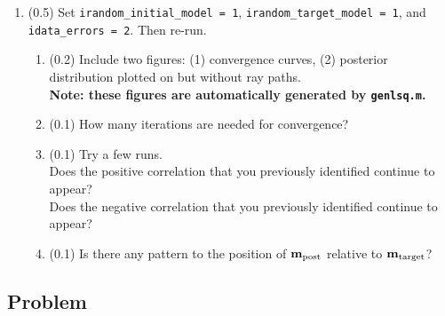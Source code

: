 \documentclass[11pt,titlepage,fleqn]{article}
\begin{document}
\begin{enumerate}

\item (0.5) Set \verb+irandom_initial_model = 1+, \verb+irandom_target_model = 1+, and \verb+idata_errors = 2+. Then re-run.
%
\begin{enumerate}
\item (0.2) Include two figures: (1) convergence curves, (2) posterior distribution plotted on  but without ray paths. \\
{\bf Note: these figures are automatically generated by \verb+genlsq.m+.}
\item (0.1) How many iterations are needed for convergence?
\item (0.1) Try a few runs. \\
Does the positive correlation that you previously identified continue to appear? \\
Does the negative correlation that you previously identified continue to appear?
\item (0.1) Is there any pattern to the position of $\mbox{${\bf m}$}_{\rm post}$ relative to $\mbox{${\bf m}$}_{\rm target}$?
\end{enumerate}

\end{enumerate}


\pagebreak

\subsection*{Problem} \howmuchtime\




\clearpage\pagebreak
%


\end{document}
